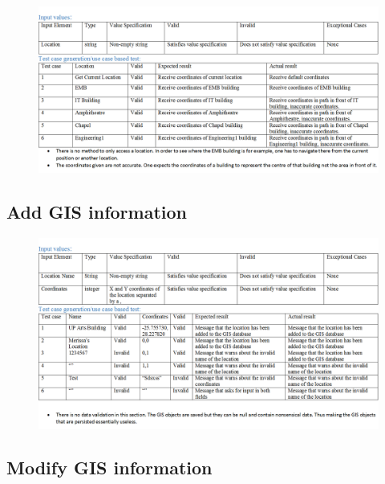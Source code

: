 \documentclass[english]{article}
\begin{document}
\begin{figure}[ht!]

\hspace*{-2.5cm} 

\includegraphics[width=180mm]{ServiceGISReq.png}

\end{figure}


\subsection{Add GIS information}

\begin{figure}[ht!]

\hspace*{-2.5cm} 

\includegraphics[width=180mm]{AddGISInformation.png}

\end{figure}


\subsection{Modify GIS information}
\end{document}
